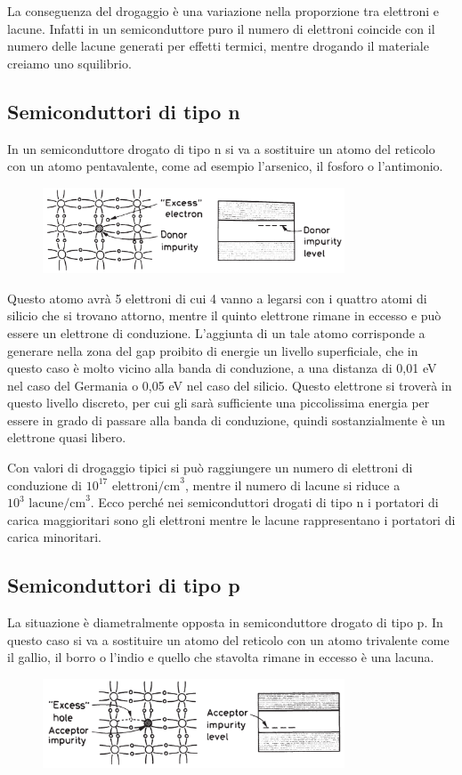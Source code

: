 La conseguenza del drogaggio è una variazione nella proporzione tra elettroni e lacune. Infatti in un semiconduttore puro il numero di elettroni coincide con il numero delle lacune generati per effetti termici, mentre drogando il materiale creiamo uno squilibrio.

\subsection{Semiconduttori di tipo n}
In un semiconduttore drogato di tipo n si va a sostituire un atomo del reticolo con un atomo pentavalente, come ad esempio l'arsenico, il fosforo o l'antimonio.
\begin{figure}[H]
   \centering
   \includegraphics[width=0.8\textwidth]{immagini/semiconduttori_drogati_tipo_n.png}
\end{figure}
Questo atomo avrà 5 elettroni di cui 4 vanno a legarsi con i quattro atomi di silicio che si trovano attorno, mentre il quinto elettrone rimane in eccesso e può essere un elettrone di conduzione. L'aggiunta di un tale atomo corrisponde a generare nella zona del gap proibito di energie un livello superficiale, che in questo caso è molto vicino alla banda di conduzione, a una distanza di 0,01 eV nel caso del Germania o 0,05 eV nel caso del silicio. Questo elettrone si troverà in questo livello discreto, per cui gli sarà sufficiente una piccolissima energia per essere in grado di passare alla banda di conduzione, quindi sostanzialmente è un elettrone quasi libero.

Con valori di drogaggio tipici si può raggiungere un numero di elettroni di conduzione di $10^{17}\text{ elettroni/cm}^3$, mentre il numero di lacune si riduce a $10^3\text{ lacune/cm}^3$. Ecco perché nei semiconduttori drogati di tipo n i portatori di carica maggioritari sono gli elettroni mentre le lacune rappresentano i portatori di carica minoritari.
\subsection{Semiconduttori di tipo p}
La situazione è diametralmente opposta in semiconduttore drogato di tipo p. In questo caso si va a sostituire un atomo del reticolo con un atomo trivalente come il gallio, il borro o l'indio e quello che stavolta rimane in eccesso è una lacuna.
\begin{figure}[H]
   \centering
   \includegraphics[width=0.8\textwidth]{immagini/semiconduttori_drogati_tipo_p.png}
\end{figure}

